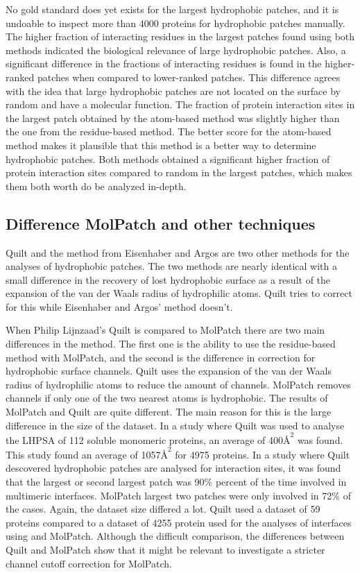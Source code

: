 \documentclass[11pt,a4paper]{article}
\begin{document}
No gold standard does yet exists for the largest hydrophobic patches, and it is undoable to inspect more than 4000 proteins for hydrophobic patches manually. The higher fraction of interacting residues in the largest patches found using both methods indicated the biological relevance of large hydrophobic patches. Also, a significant difference in the fractions of interacting residues is found in the higher-ranked patches when compared to lower-ranked patches. This difference agrees with the idea that large hydrophobic patches are not located on the surface by random and have a molecular function. The fraction of protein interaction sites in the largest patch obtained by the atom-based method was slightly higher than the one from the residue-based method. The better score for the atom-based method makes it plausible that this method is a better way to determine hydrophobic patches. Both methods obtained a significant higher fraction of protein interaction sites compared to random in the largest patches, which makes them both worth do be analyzed in-depth.

\subsection{Difference MolPatch and other techniques}

Quilt and the method from Eisenhaber and Argos are two other methods for the analyses of hydrophobic patches. The two methods are nearly identical with a small difference in the recovery of lost hydrophobic surface as a result of the expansion of the van der Waals radius of hydrophilic atoms. Quilt tries to correct for this while Eisenhaber and Argos' method doesn't. 

When Philip Lijnzaad's Quilt is compared to MolPatch there are two main differences in the method. The first one is the ability to use the residue-based method with MolPatch, and the second is the difference in correction for hydrophobic surface channels. Quilt uses the expansion of the van der Waals radius of hydrophilic atoms to reduce the amount of channels. MolPatch removes channels if only one of the two nearest atoms is hydrophobic. The results of MolPatch and Quilt are quite different. The main reason for this is the large difference in the size of the dataset. In a study where Quilt was used to analyse the LHPSA of 112 soluble monomeric proteins, an average of 400$\si{\angstrom}^2$ was found. This study found an average of 1057$\si{\angstrom}^2$ for 4975 proteins. In a study where Quilt descovered hydrophobic patches are analysed for interaction sites, it was found that the largest or second largest patch was 90\% percent of the time involved in multimeric interfaces. MolPatch largest two patches were only involved in 72\% of the cases. Again, the dataset size differed a lot. Quilt used a dataset of 59 proteins compared to a dataset of 4255 protein used for the analyses of interfaces using and MolPatch. Although the difficult comparison, the differences between Quilt and MolPatch show that it might be relevant to investigate a stricter channel cutoff correction for MolPatch.   
\end{document}
